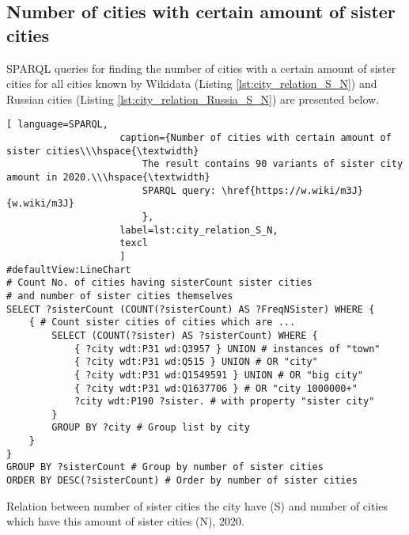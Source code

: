 \subsection{Number of cities with certain amount of sister cities}

SPARQL queries for finding the number of cities with a certain amount of sister cities for all cities known by Wikidata (Listing \ref{lst:city_relation_S_N}) and Russian cities (Listing \ref{lst:city_relation_Russia_S_N}) are presented below.

\begin{lstlisting}[ language=SPARQL, 
                    caption={Number of cities with certain amount of sister cities\\\hspace{\textwidth}
                        The result contains 90 variants of sister city amount in 2020.\\\hspace{\textwidth}
                        SPARQL query: \href{https://w.wiki/m3J}{w.wiki/m3J}
                        },
                    label=lst:city_relation_S_N,
                    texcl 
                    ]
#defaultView:LineChart
# Count No. of cities having sisterCount sister cities 
# and number of sister cities themselves
SELECT ?sisterCount (COUNT(?sisterCount) AS ?FreqNSister) WHERE {                                                                         
	{ # Count sister cities of cities which are ...
		SELECT (COUNT(?sister) AS ?sisterCount) WHERE {        
			{ ?city wdt:P31 wd:Q3957 } UNION # instances of "town"
			{ ?city wdt:P31 wd:Q515 } UNION # OR "city"
			{ ?city wdt:P31 wd:Q1549591 } UNION # OR "big city"
			{ ?city wdt:P31 wd:Q1637706 } # OR "city 1000000+"
			?city wdt:P190 ?sister. # with property "sister city"
		}
		GROUP BY ?city # Group list by city
	}
}
GROUP BY ?sisterCount # Group by number of sister cities                                     
ORDER BY DESC(?sisterCount) # Order by number of sister cities 
\end{lstlisting}%

\begin{marginfigure}
{
\setlength{\fboxsep}{0pt}%
\setlength{\fboxrule}{1pt}%
}
	\caption{Relation between number of sister cities the city have (S) and number of cities which have this amount of sister cities (N), 2020.}
\end{marginfigure}

